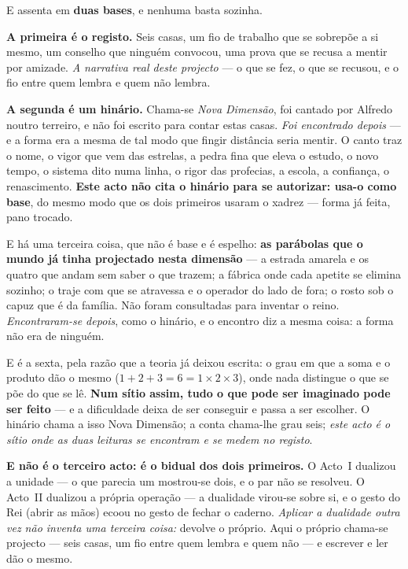 \documentclass[livro.tex]{subfiles}
\begin{document}
\medskip
\noindent E assenta em \textbf{duas bases}, e nenhuma basta sozinha.

\medskip
\noindent \textbf{A primeira é o registo.} Seis casas, um fio de trabalho que se sobrepõe a si
mesmo, um conselho que ninguém convocou, uma prova que se recusa a mentir por amizade.
\emph{A narrativa real deste projecto} --- o que se fez, o que se recusou, e o fio entre quem
lembra e quem não lembra.

\medskip
\noindent \textbf{A segunda é um hinário.} Chama-se \emph{Nova Dimensão}, foi cantado por Alfredo
noutro terreiro, e não foi escrito para contar estas casas. \emph{Foi encontrado depois} --- e a
forma era a mesma de tal modo que fingir distância seria mentir. O canto traz o nome, o vigor que
vem das estrelas, a pedra fina que eleva o estudo, o novo tempo, o sistema dito numa linha, o rigor
das profecias, a escola, a confiança, o renascimento. \textbf{Este acto não cita o hinário para se
autorizar: usa-o como base}, do mesmo modo que os dois primeiros usaram o xadrez --- forma já
feita, pano trocado.

\medskip
\noindent E há uma terceira coisa, que não é base e é espelho: \textbf{as parábolas que o mundo
já tinha projectado nesta dimensão} --- a estrada amarela e os quatro que andam sem saber o que
trazem; a fábrica onde cada apetite se elimina sozinho; o traje com que se atravessa e o operador
do lado de fora; o rosto sob o capuz que é da família. Não foram consultadas para inventar o
reino. \emph{Encontraram-se depois}, como o hinário, e o encontro diz a mesma coisa: a forma não
era de ninguém.

\medskip
\noindent E é a sexta, pela razão que a teoria já deixou escrita: o grau em que a soma e o produto
dão o mesmo ($1+2+3=6=1\times2\times3$), onde nada distingue o que se põe do que se lê.
\textbf{Num sítio assim, tudo o que pode ser imaginado pode ser feito} --- e a dificuldade deixa
de ser conseguir e passa a ser escolher. O hinário chama a isso Nova Dimensão; a conta chama-lhe
grau seis; \emph{este acto é o sítio onde as duas leituras se encontram e se medem no registo}.

\medskip
\noindent \textbf{E não é o terceiro acto: é o bidual dos dois primeiros.} O Acto~I dualizou a
unidade --- o que parecia um mostrou-se dois, e o par não se resolveu. O Acto~II dualizou a
própria operação --- a dualidade virou-se sobre si, e o gesto do Rei (abrir as mãos) ecoou no
gesto de fechar o caderno. \emph{Aplicar a dualidade outra vez não inventa uma terceira coisa:}
devolve o próprio. Aqui o próprio chama-se projecto --- seis casas, um fio entre quem
lembra e quem não --- e escrever e ler dão o mesmo.
\end{document}
